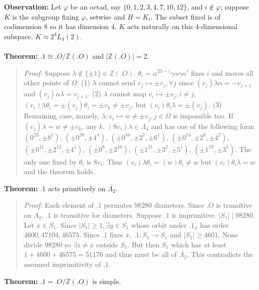 {\bf Observation:}
Let $\varphi$ be an octad, say $\{ 0,1,2,3,4,7,10,12 \}$,
and $i \notin \varphi$; suppose $K$ is the subgroup fixing $\varphi$,
setwise and $H= K_i$.  The subset fixed is of codimension $8$ so it has dimension $4$.  $K$
acts naturally on this $4$-dimensional subspace.  $K \approx 2^4 L_4(2)$.
\\
\\
{\bf Theorem:} 
$.1 \cong .O/{\mathbb Z}(.O)$ and
$|{\mathbb Z}(.O)|= 2$.
\begin{quote}
\emph{Proof:} 
Suppose $\lambda \notin \{\pm1\} \in {\mathbb Z}(.O)$.
$\theta_i= \alpha^{23-i} \gamma \alpha  \gamma \alpha^i $ fixes $i$ and moves all other
points of $\Omega$.  
(1) $\lambda$ cannot send $v_j \mapsto \pm v_j, \forall j$ since
$(v_j)\lambda \alpha = - v_{j+1}$ and
$(v_j)\alpha \lambda= v_{j+1}$.  
(2) $\lambda$ cannot map $v_i \mapsto \pm v_j, i \ne j$, 
$(v_i) \lambda \theta_i= \pm (v_j) \theta_i= \pm v_k \ne \pm  v_j$, but
$(v_i) \theta_i \lambda= \pm (v_j)$.
(3) Remaining case, namely, $\lambda: v_i \mapsto w \ne \pm v_j, j \in \Omega$ is impossible too.
If $(v_j)\lambda = w \ne \pm v_k$, any $k$.  $(8v_i)\lambda \in \Lambda_4$ and has one of the following
form $(0^{23},\pm 8^{1})$, $(\pm 0^{20},\pm 4^{4})$, $(\pm 0^{16},\pm 2^{7}, \pm 6^{1})$,
$(\pm 0^{14},\pm 2^{8}, \pm 4^{2})$, $(\pm 0^{11},\pm 2^{12}, \pm 4^{1})$, $(\pm 0^{8},\pm 2^{16})$,
$(\pm 1^{21},\pm 3^{2}, \pm 5^{1})$, $(\pm 1^{19},\pm 3^{5})$.  The only one fixed by $\theta_i$ is
$8v_i$.  Thus
$(v_i) \lambda \theta_i = (w)\theta_i \ne w$ but
$(v_i) \theta_i \lambda= w$ and the theorem holds.
\end{quote}
{\bf Theorem:}
$.1$ acts primitively on ${\overline {\Lambda_2}}$.
\begin{quote}
\emph{Proof:} 
Each element of $.1$ permutes $98280$ diameters.  Since $.O$ is transitive on
$\Lambda_2$, $.1$ is transitive for diameters.  Suppose
$.1$ is imprimitive.  $|S_1| \mid 98280$.  Let ${\overline x} \in S_1$.
Since $|S_1| \ge 1, \exists y \in S_1$ whose orbit under $.1_{\overline x}$
has order $4600, 47104, 46575$.  Since $.1$ fixes ${\overline x}$,
$.1: S_1 \rightarrow S_1$ and $|S_1| \ge 4601$.  None divide
$98280$ so $\exists {\overline z} \ne {\overline x}$ outside $S_1$.
But then $S_1$ which has at least $1+4600+46575=51176$ and thus must be all of
${\overline {\Lambda_2}}$.  This contradicts the assumed imprimitivity of $.1$.
\end{quote}
{\bf Theorem:}
$.1= .O/{\mathbb Z}(.O)$ is simple.
